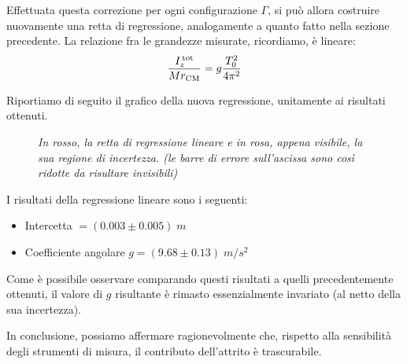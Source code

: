\documentclass{article}
\begin{document}
Effettuata questa correzione per ogni configurazione $\Gamma$,
si può allora costruire nuovamente una retta di regressione,
analogamente a quanto fatto nella sezione precedente.
La relazione fra le grandezze misurate, ricordiamo, è lineare:
\[ \frac{I_z^\text{\,tot}}{Mr_\text{CM}} = g \frac{T_0^2}{4\pi^2} \]

Riportiamo di seguito il grafico della nuova regressione,
unitamente ai risultati ottenuti.

\begin{figure}[H]
  \caption[]{\emph{
    In rosso, la retta di regressione lineare e in rosa,
    appena visibile, la sua regione di incertezza.
    (le barre di errore sull'ascissa sono così ridotte
    da risultare invisibili)
  }}
\end{figure}

I risultati della regressione lineare sono i seguenti:
\begin{itemize}
  \item Intercetta $= (0.003 \pm 0.005)\;\unit{m}$
  \item Coefficiente angolare $g = (9.68 \pm 0.13)\;\unit{m\per s^2}$
\end{itemize}

Come è possibile osservare comparando questi risultati a
quelli precedentemente ottenuti, il valore di $g$ risultante
è rimasto essenzialmente invariato (al netto della sua incertezza).

In conclusione, possiamo affermare ragionevolmente che,
rispetto alla sensibilità degli strumenti di misura,
il contributo dell'attrito è trascurabile.
\end{document}
